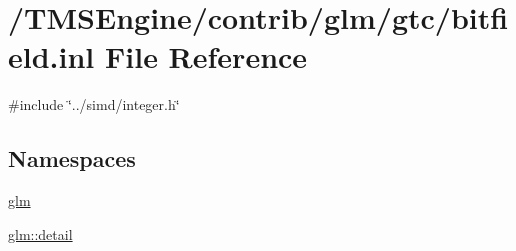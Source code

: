 \hypertarget{bitfield_8inl}{}\section{/\+T\+M\+S\+Engine/contrib/glm/gtc/bitfield.inl File Reference}
\label{bitfield_8inl}
{\ttfamily \#include \char`\"{}../simd/integer.\+h\char`\"{}}\newline
\subsection*{Namespaces}
\begin{DoxyCompactItemize}
\item 
 \hyperlink{namespaceglm}{glm}
\item 
 \hyperlink{namespaceglm_1_1detail}{glm\+::detail}
\end{DoxyCompactItemize}
